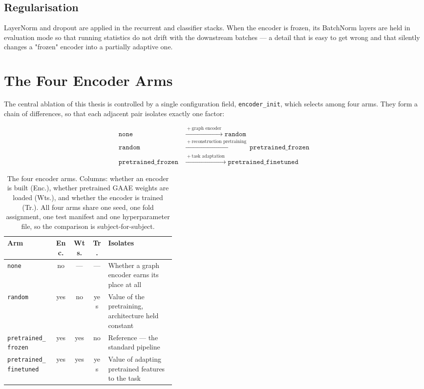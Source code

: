 \subsection{Regularisation}

LayerNorm and dropout are applied in the recurrent and classifier stacks. When the encoder
is frozen, its BatchNorm layers are held in evaluation mode so that running statistics do
not drift with the downstream batches --- a detail that is easy to get wrong and that
silently changes a "frozen" encoder into a partially adaptive one.

\section{The Four Encoder Arms}
\label{sec:encoder-arms}

The central ablation of this thesis is controlled by a single configuration field,
\texttt{encoder\_init}, which selects among four arms. They form a chain of differences, so
that each adjacent pair isolates exactly one factor:

\begin{align*}
  \texttt{none}
    \;&\xrightarrow{\;+\ \text{graph encoder}\;}\; \texttt{random} \\[0.3em]
  \texttt{random}
    \;&\xrightarrow{\;+\ \text{reconstruction pretraining}\;}\; \texttt{pretrained\_frozen} \\[0.3em]
  \texttt{pretrained\_frozen}
    \;&\xrightarrow{\;+\ \text{task adaptation}\;}\; \texttt{pretrained\_finetuned}
\end{align*}

\begin{table}[htbp]
  \centering
  \small
  \begin{tabular}{@{}lccc p{0.40\linewidth}@{}}
    \toprule
    \textbf{Arm} & \textbf{Enc.} & \textbf{Wts.} & \textbf{Tr.} & \textbf{Isolates} \\
    \midrule
    \texttt{none}                 & no  & --- & --- & Whether a graph encoder earns its place at all \\
    \texttt{random}               & yes & no  & yes & Value of the pretraining, architecture held constant \\
    \texttt{pretrained\_frozen}   & yes & yes & no  & Reference --- the standard pipeline \\
    \texttt{pretrained\_finetuned}& yes & yes & yes & Value of adapting pretrained features to the task \\
    \bottomrule
  \end{tabular}
  \caption{The four encoder arms. Columns: whether an encoder is built (Enc.), whether
    pretrained GAAE weights are loaded (Wts.), and whether the encoder is trained (Tr.).
    All four arms share one seed, one fold assignment, one test manifest and one
    hyperparameter file, so the comparison is subject-for-subject.}
  \label{tab:encoder-arms}
\end{table}

